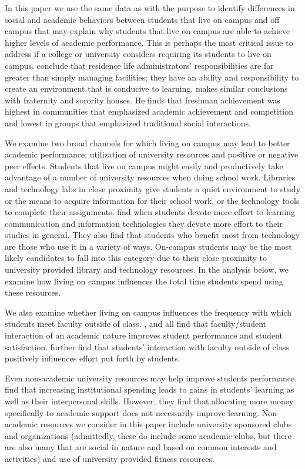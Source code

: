 \documentclass[10pt]{article}
\newcommand{\citee}[1]{\citename{#1} \citeyear{#1}}
\begin{document}
In this paper we use the same data as \citee{dam2010} with the purpose to identify differences in social and academic behaviors between students that live on campus and off campus that may explain why students that live on campus are able to achieve higher levels of academic performance.  This is perhaps the most critical issue to address if a college or university considers requiring its students to live on campus.  \citee{sm1994} conclude that residence life administrators' responsibilities are far greater than simply managing facilities; they have an ability and responsibility to create an environment that is conducive to learning.  \citee{schrager1986} makes similar conclusions with fraternity and sorority houses.  He finds that freshman achievement was highest in communities that emphasized academic achievement and competition and lowest in groups that emphasized traditional social interactions.

We examine two broad channels for which living on campus may lead to better academic performance: utilization of university resources and positive or negative peer effects.  Students that live on campus might easily and productively take advantage of a number of university resources when doing school work.  Libraries and technology labs in close proximity give students a quiet environment to study or the means to acquire information for their school work, or the technology tools to complete their assignments.  \citee{kh2001a} find when students devote more effort to learning communication and information technologies they devote more effort to their studies in general.  They also find that students who benefit most from technology are those who use it in a variety of ways.  On-campus students may be the most likely candidates to fall into this category due to their close proximity to university provided library and technology resources.  In the analysis below, we examine how living on campus influences the total time students spend using these resources.

We also examine whether living on campus influences the frequency with which students meet faculty outside of class.  \citee{pt1991}, \citee{astin1993} and \citee{kh2001} all find that faculty/student interaction of an academic nature improves student performance and student satisfaction.   further find that students' interaction with faculty outside of class positively influences effort put forth by students.

Even non-academic university resources may help improve students performance.  \citee{ts2001} find that increasing institutional spending leads to gains in students' learning as well as their interpersonal skills.  However, they find that allocating more money specifically to academic support does not necessarily improve learning.  Non-academic resources we consider in this paper include university sponsored clubs and organizations (admittedly, these do include some academic clubs, but there are also many that are social in nature and based on common interests and activities) and use of university provided fitness resources.
\end{document}
